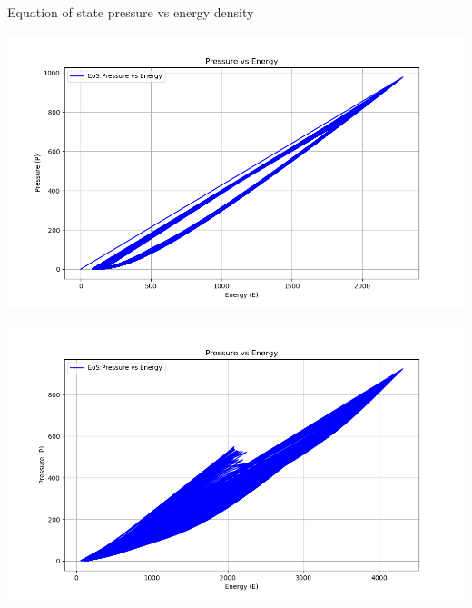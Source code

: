 \documentclass[12pt,aspectratio169]{beamer}
\begin{document}
\begin{frame}{Equation of state pressure vs energy density}
\begin{minipage}[t]{0.48\textwidth}
  \centering
  \includegraphics[width=0.9\linewidth]{pressure_vs_energy3.png}
\end{minipage}
\hfill
\begin{minipage}[t]{0.48\textwidth}
  \centering
  \includegraphics[width=0.9\linewidth]{pressure_vs_energy4.png}
\end{minipage}
    
\end{frame}
\end{document}
